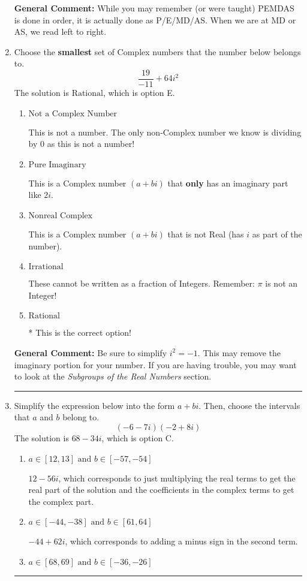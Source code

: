 \documentclass{extbook}[14pt]
\newcommand{\litem}[1]{\item #1

\rule{\textwidth}{0.4pt}}
\begin{document}
\begin{enumerate}
{\textbf{General Comment:} While you may remember (or were taught) PEMDAS is done in order, it is actually done as P/E/MD/AS. When we are at MD or AS, we read left to right.
}
\litem{
Choose the \textbf{smallest} set of Complex numbers that the number below belongs to.
\[ \frac{19}{-11}+64i^2 \]The solution is \( \text{Rational} \), which is option E.\begin{enumerate}[label=\Alph*.]
\item \( \text{Not a Complex Number} \)

This is not a number. The only non-Complex number we know is dividing by 0 as this is not a number!
\item \( \text{Pure Imaginary} \)

This is a Complex number $(a+bi)$ that \textbf{only} has an imaginary part like $2i$.
\item \( \text{Nonreal Complex} \)

This is a Complex number $(a+bi)$ that is not Real (has $i$ as part of the number).
\item \( \text{Irrational} \)

These cannot be written as a fraction of Integers. Remember: $\pi$ is not an Integer!
\item \( \text{Rational} \)

* This is the correct option!
\end{enumerate}

\textbf{General Comment:} Be sure to simplify $i^2 = -1$. This may remove the imaginary portion for your number. If you are having trouble, you may want to look at the \textit{Subgroups of the Real Numbers} section.
}
\litem{
Simplify the expression below into the form $a+bi$. Then, choose the intervals that $a$ and $b$ belong to.
\[ (-6 - 7 i)(-2 + 8 i) \]The solution is \( 68 - 34 i \), which is option C.\begin{enumerate}[label=\Alph*.]
\item \( a \in [12, 13] \text{ and } b \in [-57, -54] \)

 $12 - 56 i$, which corresponds to just multiplying the real terms to get the real part of the solution and the coefficients in the complex terms to get the complex part.
\item \( a \in [-44, -38] \text{ and } b \in [61, 64] \)

 $-44 + 62 i$, which corresponds to adding a minus sign in the second term.
\item \( a \in [68, 69] \text{ and } b \in [-36, -26] \)


\end{enumerate}}
\end{enumerate}
\end{document}
